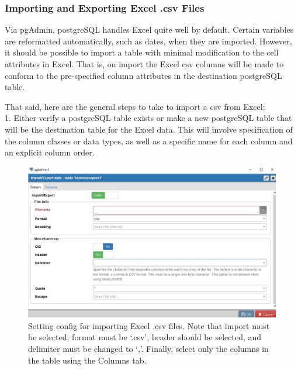 \documentclass[]{article}
\begin{document}
\subsubsection{Importing and Exporting Excel .csv
Files}\label{importing-and-exporting-excel-.csv-files}

Via pgAdmin, postgreSQL handles Excel quite well by default. Certain
variables are reformatted automatically, such as dates, when they are
imported. However, it should be possible to import a table with minimal
modification to the cell attributes in Excel. That is, on import the
Excel csv columns will be made to conform to the pre-specified column
attributes in the destination postgreSQL table.

That said, here are the general steps to take to import a csv from
Excel:\\
1. Either verify a postgreSQL table exists or make a new postgreSQL
table that will be the destination table for the Excel data. This will
involve specification of the column classes or data types, as well as a
specific name for each column and an explicit column order.

\begin{figure}[htbp]
\centering
\includegraphics{csv_importoptions.jpg}
\caption{Setting config for importing Excel .csv files. Note that import
must be selected, format must be `.csv', header should be selected, and
delimiter must be changed to `,'. Finally, select only the columns in
the table using the Columns tab.}
\end{figure}
\end{document}
